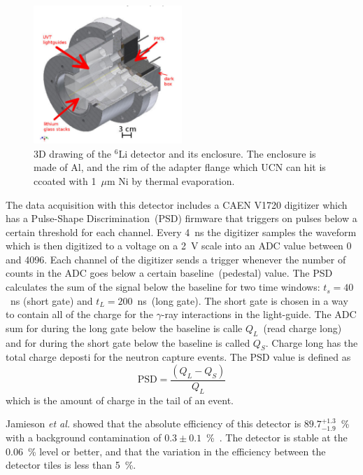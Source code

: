 \begin{figure}[h]
  \centering
  \includegraphics[width=0.5\textwidth]{Li6detector.png}
  \caption{3D drawing of the $^6$Li detector and its enclosure. The
    enclosure is made of Al, and the rim of the adapter flange which
    UCN can hit is ccoated with 1~$\mu$m Ni by thermal evaporation. }
  \label{fig:Li6detector}
\end{figure}

The data acquisition with this detector includes a CAEN V1720
digitizer which has a Pulse-Shape Discrimination~(PSD) firmware that
triggers on pulses below a certain threshold for each channel. Every
4~ns the digitizer samples the waveform which is then digitized to a
voltage on a 2~V scale into an ADC value between 0 and 4096. Each
channel of the digitizer sends a trigger whenever the number of counts
in the ADC goes below a certain baseline~(pedestal) value. The PSD
calculates the sum of the signal below the baseline for two time
windows: $t_s = 40$~ns (short gate) and $t_L = 200$~ns~(long
gate). The short gate is chosen in a way to contain all of the charge
for the $\gamma$-ray interactions in the light-guide. The ADC sum for
during the long gate below the baseline is calle $Q_L$~(read charge
long) and for during the short gate below the baseline is called
$Q_S$. Charge long has the total charge deposti for the neutron
capture events. The PSD value is defined as
\begin{equation}
  \label{eq:psd}
  \mathrm{PSD} = \frac{\left( Q_L - Q_S\right)}{Q_L}
\end{equation}  
which is the amount of charge in the tail of an event.

Jamieson {\it{et al.}} showed that the absolute efficiency of this
detector is $89.7^{+1.3}_{-1.9}$~\% with a background contamination of
$0.3 \pm 0.1$~\%~\cite{jamieson2017characterization}. The detector is
stable at the 0.06~\% level or better, and that the variation in the
efficiency between the detector tiles is less than 5~\%.
